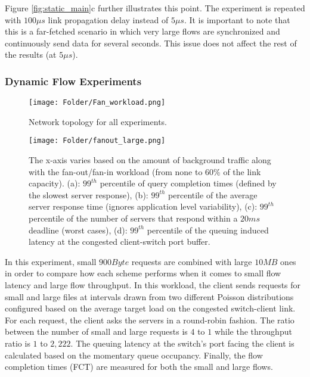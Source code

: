\documentclass[10pt,conference,compsocconf]{IEEEtran}
\begin{document}
Figure \ref{fig:static_main}c further illustrates this point. The experiment is repeated with $100\mu s$ link propagation delay instead of $5\mu s$. It is important to note that this is a far-fetched scenario in which very large flows are synchronized and continuously send data for several seconds. This issue does not affect the rest of the results (at $5\mu s$).



\subsubsection*{\textbf{Dynamic Flow Experiments}} \label{sec:dynamic}

\begin{figure}[h]
    \centering
    \texttt{[image: Folder/Fan\_workload.png]}
    \setlength{\belowcaptionskip}{-0.4cm}
    \caption{Network topology for all experiments.}  
    \label{fig:topology}
\end{figure} 

\begin{figure*}[ht]
    \centering
    \texttt{[image: Folder/fanout\_large.png]}
    \caption{The x-axis varies based on the amount of background traffic along with the fan-out/fan-in workload (from none to $60\%$ of the link capacity). (a): $99^{th}$ percentile of query completion times (defined by the slowest server response), (b): $99^{th}$ percentile of the average server response time (ignores application level variability), (c): $99^{th}$ percentile of the number of servers that respond within a $20ms$ deadline (worst cases), (d): $99^{th}$ percentile of the queuing induced latency at the congested client-switch port buffer.}  
    \label{fig:search}
\end{figure*} 




In this experiment, small $900Byte$ requests are combined with large $10MB$ ones in order to compare how each scheme performs when it comes to small flow latency and large flow throughput. In this workload, the client sends requests for small and large files at intervals drawn from two different Poisson distributions configured based on the average target load on the congested switch-client link. For each request, the client asks the servers in a round-robin fashion. The ratio between the number of small and large requests is $4$ to $1$ while the throughput ratio is $1$ to $2,222$. The queuing latency at the switch's port facing the client is calculated based on the momentary queue occupancy. Finally, the flow completion times (FCT) are measured for both the small and large flows.
\end{document}
